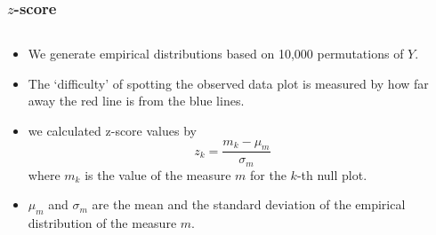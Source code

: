 \documentclass{beamer}
\begin{document}
\begin{frame}
\frametitle{$z$-score}
	\begin{columns}

	\begin{column}{0.55\textwidth}
		\begin{itemize}
		\item We generate empirical distributions based on 10,000 permutations of $Y$.
		\item The `difficulty' of spotting the observed data plot is measured by how far away the red 		line is from the blue lines.
		\item we calculated z-score values by
		$$z_k = \frac{m_k - \mu_m}{\sigma_m}$$
		where $m_k$ is the value of the measure $m$ for the $k$-th null plot.
		\item  $\mu_m$ and $\sigma_m$ are the mean and the standard deviation of the empirical 		distribution of the measure $m$.
		\end{itemize}
	\end{column}

	\begin{column}{0.45\textwidth}
		 \begin{center}
		 \end{center}
	\end{column}
\end{columns}
\end{frame}
\end{document}
